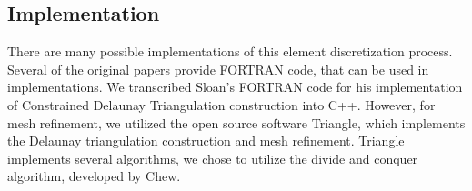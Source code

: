 \documentclass[../fem.tex]{subfile}
\begin{document}


\subsection{Implementation}%
\label{sub:implementation}

There are many possible implementations of this element discretization process.
Several of the original papers provide FORTRAN code, that can be used in
implementations. We transcribed Sloan's FORTRAN code for his implementation of
Constrained Delaunay Triangulation construction into C++. However, for mesh
refinement, we utilized the open source software Triangle\cite{T_SOF}, which
implements the Delaunay triangulation construction and mesh refinement.
Triangle implements several algorithms, we chose to utilize the divide and
conquer algorithm, developed by Chew.
\end{document}
